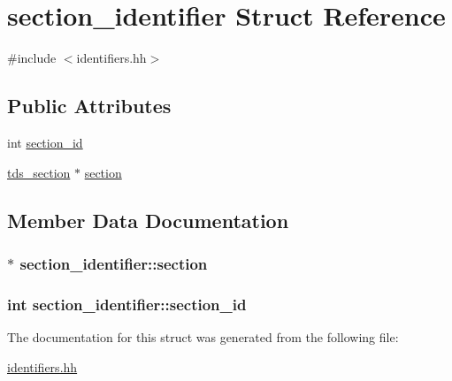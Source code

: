 \hypertarget{structsection__identifier}{}\section{section\+\_\+identifier Struct Reference}
\label{structsection__identifier}


{\ttfamily \#include $<$identifiers.\+hh$>$}

\subsection*{Public Attributes}
\begin{DoxyCompactItemize}
\item 
int \hyperlink{structsection__identifier_a09ca225eec6a949e98efb59687e6b4ca}{section\+\_\+id}
\item 
\hyperlink{classtds__section}{tds\+\_\+section} $\ast$ \hyperlink{structsection__identifier_a379de132baa2a9a5949decef3e4bb85e}{section}
\end{DoxyCompactItemize}


\subsection{Member Data Documentation}
\subsubsection[{\texorpdfstring{section}{section}}]{$\ast$ section\+\_\+identifier\+::section}\hypertarget{structsection__identifier_a379de132baa2a9a5949decef3e4bb85e}{}\label{structsection__identifier_a379de132baa2a9a5949decef3e4bb85e}
\subsubsection[{\texorpdfstring{section\+\_\+id}{section_id}}]{\setlength{\rightskip}{0pt plus 5cm}int section\+\_\+identifier\+::section\+\_\+id}\hypertarget{structsection__identifier_a09ca225eec6a949e98efb59687e6b4ca}{}\label{structsection__identifier_a09ca225eec6a949e98efb59687e6b4ca}


The documentation for this struct was generated from the following file\+:\begin{DoxyCompactItemize}
\item 
\hyperlink{identifiers_8hh}{identifiers.\+hh}\end{DoxyCompactItemize}
